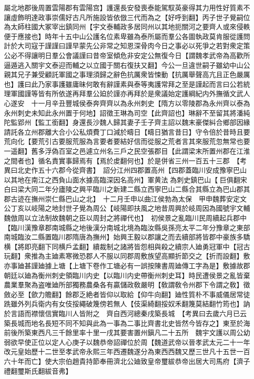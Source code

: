 屬北地郡後周置雲陽郡有雲陽宫】護還長安發喪泰能駕馭英豪得其力用性好質素不讓虛飾明達政事崇儒好古凡所施設皆依倣三代而為之【好呼到翻】丙子世子覺嗣位為太師柱國大冢宰出鎮同州【宇文泰輔政多居同州以其地扼關河之要齊人或來侵軼便于應接也】時年十五中山公護名位素卑雖為泰所屬而羣公各圖執政莫肯服從護問計於大司寇于謹謹曰謹早蒙先公非常之知恩深骨肉今日之事必以死爭之若對衆定策公必不得讓明日羣公會議謹曰昔帝室傾危非安定公無復今日【謂魏孝武帝為高歡所逼遁逃入關宇文泰迎而輔之以立國于關右復扶又翻】今公一旦違世嗣子雖幼中山公親其兄子兼受顧託軍國之事理須歸之辭色抗厲衆皆悚動【抗厲舉聲高亢且正色嚴厲也】護曰此乃家事護雖庸昧何敢有辭謹素與泰等夷護常拜之至是謹起而言曰公若統理軍國謹等皆有所依遂再拜羣公廹於謹亦再拜於是衆議始定護綱紀内外撫循文武人心遂安　十一月辛丑豐城侯泰奔齊齊以為永州刺史【隋方以零陵郡為永州齊以泰為永州刺史未知此永州置于何地】詔徵王琳為司空【此齊詔也】琳辭不至留其將潘純陀監郢州【監工銜翻】身還長沙魏人歸其妻子壬子齊主詔以魏末豪傑糾合鄉部因緣請託各立州郡離大合小公私煩費丁口減於疇日【疇日猶言昔日】守令倍於昔時且要荒向化【要荒引古要服荒服為言要者要結好信而從服之荒者言其來服荒忽無常也要一遥翻】舊多浮偽百室之邑遽立州名三戶之民空張郡目【此謂梁末所置州郡在江淮之間者也】循名責實事歸焉有【焉於䖍翻何也】於是併省三州一百五十三郡　【考異曰北史作五十六郡今從齊書】　詔分江州四郡置高州【四郡蓋臨川安成豫寧巴山以其地在南江之西負山面水據高臨深因名高州】軍黄法為刺史鎮巴山【巨俱翻宋白曰梁大同二年分廬陵之興平臨川之新建二縣立西寧巴山二縣合其縣立為巴山郡其郡古迹在撫州崇仁縣巴山之北】　十二月壬申以曲江侯勃為太保　甲申魏葬安定文公丁亥以岐陽之地封世子覺為周公【岐陽即扶風之地昔周興於岐周因為國號宇文輔魏倣周以立法制故魏朝之臣以周封之將禪代也】　初侯景之亂臨川民周續起兵郡中【臨川漢豫章郡南城縣之地後漢分南城北境為臨汝縣吳孫亮太平二年分豫章之東部南城臨汝二縣置臨川郡隋唐為撫州】始興王毅以郡讓之而去續部將皆郡中豪族多驕横【將即亮翻下同横戶孟翻】續裁制之諸將皆怨相與殺之續宗人廸勇冠軍中【冠古玩翻】衆推為主廸素寒微恐郡人不服以同郡周敷族望高顯折節交之【折而設翻】敷亦事廸甚謹廸據上塘【上塘下卷作工塘必有一誤按陳書周廸傳工字為是】敷據故郡朝廷以廸為衡州刺史領臨川内史【以臨川内史帶衡州刺史耳】時民遭侯景之亂皆棄農業羣聚為盗唯廸所部獨務農桑各有贏儲政敎嚴明【敎謂敎令州郡下令謂之敎】徵斂必至【歛力贍翻】餘郡乏絶者皆仰以取給【仰牛向翻】廸性質朴不事威儀居常徒跣雖外列兵衛内有女伎挼繩破篾傍若無人【伎渠綺翻挼奴禾翻篾莫結翻竹筠也】訥於言語而襟懷信實臨川人皆附之　齊自西河總秦戌築長城　【考異曰去歲六月已云築長城而地名長短不同不知與此為一事為二事比齊書北史皆然今皆存之】東至於海前後所築東西凡三千餘里率十里一戌其要害置州鎭凡二十五所　魏宇文護以周公幼弱欲早使正位以定人心庚子以魏恭帝詔禪位於周【魏道武帝以晉孝武太元二十一年改元皇始歷十二世至孝武帝永熙三年西遷魏遂分為東西西魏又歷三世凡十五世一百六十年而亡】使大宗伯趙貴持節奉冊濟北公廸致皇帝璽紱恭帝出居大司馬府【濟子禮翻璽斯氏翻紱音弗】

